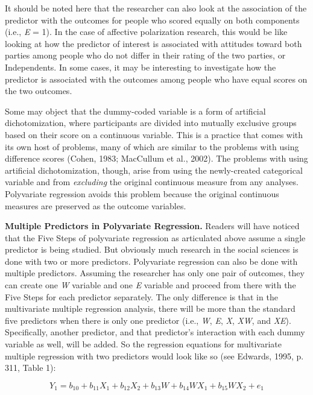 \documentclass[authordate, meta]{jote-new-article}
\begin{document}
	It should be noted here that the researcher can also look at the association of the predictor with the outcomes for people who scored equally on both components (i.e., \emph{E} = 1). In the case of affective polarization research, this would be like looking at how the predictor of interest is associated with attitudes toward both parties among people who do not differ in their rating of the two parties, or Independents. In some cases, it may be interesting to investigate how the predictor is associated with the outcomes among people who have equal scores on the two outcomes.



	Some may object that the dummy-coded variable is a form of artificial dichotomization, where participants are divided into mutually exclusive groups based on their score on a continuous variable. This is a practice that comes with its own host of problems, many of which are similar to the problems with using difference scores (Cohen, 1983; MacCullum et al., 2002). The problems with using artificial dichotomization, though, arise from using the newly-created categorical variable and from \emph{excluding} the original continuous measure from any analyses. Polyvariate regression avoids this problem because the original continuous measures are preserved as the outcome variables.



	\textbf{Multiple Predictors in Polyvariate Regression.} Readers will have noticed that the Five Steps of polyvariate regression as articulated above assume a single predictor is being studied. But obviously much research in the social sciences is done with two or more predictors. Polyvariate regression can also be done with multiple predictors. Assuming the researcher has only one pair of outcomes, they can create one \emph{W} variable and one \emph{E} variable and proceed from there with the Five Steps for each predictor separately. The only difference is that in the multivariate multiple regression analysis, there will be more than the standard five predictors when there is only one predictor (i.e., \emph{W}, \emph{E}, \emph{X}, \emph{XW}, and \emph{XE}). Specifically, another predictor, and that predictor's interaction with each dummy variable as well, will be added. So the regression equations for multivariate multiple regression with two predictors would look like so (see Edwards, 1995, p. 311, Table 1):



	\begin{equation}
		Y_1= b_{10}+b_{11}X_1+b_{12}X_2+b_{13}W+b_{14}WX_1+b_{15}WX_2+e_1
	\end{equation}
\end{document}
